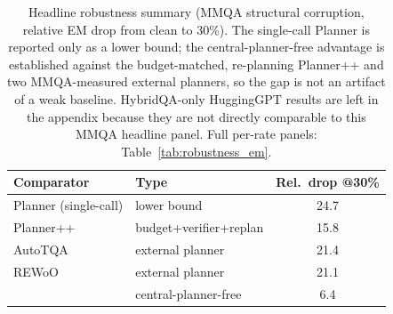 \begin{table}[t]
\centering
\small
\begin{tabular}{@{}llc@{}}
\toprule
\textbf{Comparator} & \textbf{Type} & \textbf{Rel.\ drop @30\%} \\
\midrule
Planner (single-call) & lower bound            & 24.7 \\
Planner++             & budget+verifier+replan & 15.8 \\
AutoTQA               & external planner       & 21.4 \\
REWoO                 & external planner       & 21.1 \\
\rowcolor{lightgreen}
\method{}             & central-planner-free   & 6.4 \\
\bottomrule
\end{tabular}
\caption{Headline robustness summary (MMQA structural corruption, relative EM
drop from clean to 30\%). The single-call Planner is reported only as a lower
bound; the central-planner-free advantage is established against the
budget-matched, re-planning Planner++ and two MMQA-measured external planners,
so the gap is not an artifact of a weak baseline. HybridQA-only HuggingGPT
results are left in the appendix because they are not directly comparable to
this MMQA headline panel. Full per-rate panels: Table~\ref{tab:robustness_em}.}
\label{tab:headline_robustness}
\end{table}
